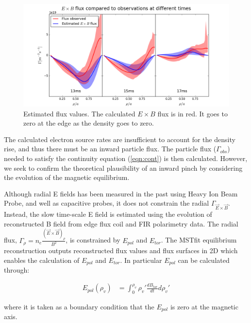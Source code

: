 \documentclass[aip, pop, preprint]{revtex4-1}
\begin{document}
\begin{figure}
	\centering
	\includegraphics[width=0.95\linewidth]{./plots/flux_comp}
	\caption{Estimated flux values. The calculated $ E\times B $ flux is in red. It goes to zero at the edge as the density goes to zero.}
	\label{fig:flux_compare}


\end{figure}

The calculated electron source rates are insufficient to account for the
density rise, and thus there must be an inward particle flux. The particle flux
($\Gamma_{obs}$) needed to satisfy the continuity equation (\ref{eqn:cont}) is
then calculated. However, we seek to confirm the theoretical plausibility of an
inward pinch by considering the evolution of the magnetic equilibrium.

Although radial E fields has been measured in the past using Heavy Ion Beam Probe, and well as capacitive probes, it does not constrain the
radial $\Gamma_{\vec{E} \times \vec{B}}$. Instead, the slow time-scale E field
is estimated using the evolution of reconstructed B field from edge flux coil
and FIR polarimetry data. The radial flux, $\Gamma_{\rho} = n_e\frac{(\Vec{E}\times\Vec{B})_{\rho}}{B^2}$, is constrained by $E_{pol}$ and $E_{tor}$. The MSTfit equilibrium reconstruction outputs
reconstructed flux values and flux surfaces in 2D which enables the calculation of $E_{pol}$ and $E_{tor}$. In particular $E_{pol}$ can be calculated through:

\begin{align}
E_{pol}(\rho_v) & = \int_{0}^{\rho_v}\rho_v' \frac{dB_{tor}}{dt} d\rho_v'
\end{align}

where it is taken as a boundary condition that the $E_{pol}$ is zero at
the magnetic axis.

\end{document}
